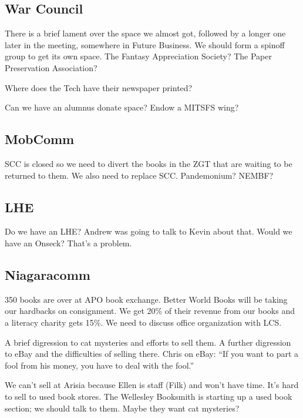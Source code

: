 \documentclass[10pt]{article}
\begin{document}
\subsection*{War Council}

There is a brief lament over the space we almost got,
followed by a longer one later in the meeting, somewhere
in Future Business.   We should form a spinoff group to
get its own space.  The Fantasy Appreciation Society?
The Paper Preservation Association?

Where does the Tech have their newspaper printed?

Can we have an alumnus donate space?  Endow a MITSFS wing?

\subsection*{MobComm}
SCC is closed so we need to divert the books in the ZGT that
are waiting to be returned to them.  We also need to replace SCC.
Pandemonium?
NEMBF?

\subsection*{LHE}
Do we have an LHE?  Andrew was going to talk to Kevin about that.
Would we have an Onseck?  That's a problem.


\subsection*{Niagaracomm}

350 books are over at APO book exchange.  Better World Books
will be taking our hardbacks on consignment.  We get 20\% of
their revenue from our books and a literacy charity gets 15\%.
We need to discuss office organization with LCS.

A brief digression to cat mysteries and efforts to sell them.
A further digression to eBay and the difficulties of selling
there.  Chris on eBay: ``If you want to part a fool from his
money, you have to deal with the fool.''

We can't sell at Arisia because Ellen is staff (Filk) and
won't have time.  It's hard to sell to used book stores.
The Wellesley Booksmith is starting up a used book section;
we should talk to them.  Maybe they want cat mysteries?
\end{document}
